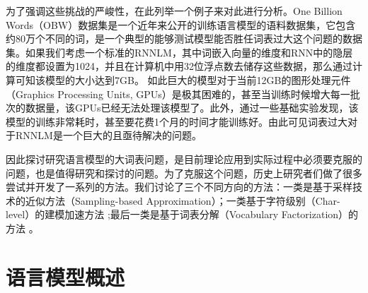 \documentclass[12pt,a4paper]{article}
\begin{document}
为了强调这些挑战的严峻性，在此列举一个例子来对此进行分析。One Billion Words（OBW）数据集是一个近年来公开的训练语言模型的语料数据集，它包含约80万个不同的词，是一个典型的能够测试模型能否胜任词表过大这个问题的数据集。如果我们考虑一个标准的RNNLM，其中词嵌入向量的维度和RNN中的隐层的维度都设置为1024，并且在计算机中用32位浮点数去储存这些数据，那么通过计算可知该模型的大小达到7GB。 如此巨大的模型对于当前12GB的图形处理元件（Graphics Processing Units, GPUs）是极其困难的，甚至当训练时候增大每一批次的数据量，该GPUs已经无法处理该模型了。此外，通过一些基础实验发现，该模型的训练非常耗时，甚至要花费1个月的时间才能训练好。由此可见词表过大对于RNNLM是一个巨大的且亟待解决的问题。

因此探讨研究语言模型的大词表问题，是目前理论应用到实际过程中必须要克服的问题，也是值得研究和探讨的问题。为了克服这个问题，历史上研究者们做了很多尝试并开发了一系列的方法。我们讨论了三个不同方向的方法：一类是基于采样技术的近似方法（Sampling-based Approximation）\cite{DBLP:journals/tnn/BengioS08,DBLP:journals/jmlr/GutmannH12}；一类基于字符级别（Char-level）的建模加速方法 \cite{DBLP:conf/aaai/KimJSR16};最后一类是基于词表分解（Vocabulary Factorization）的方法 \cite{DBLP:conf/icassp/Goodman01,DBLP:conf/icassp/MikolovKBCK11}。


\section{语言模型概述}
\end{document}
